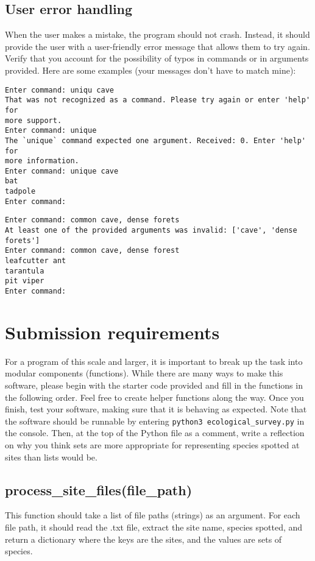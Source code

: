 \documentclass[12pt,letterpaper]{article}
\begin{document}
\subsection{User error handling}
When the user makes a mistake, the program should not crash. Instead, it should provide the user with a user-friendly error message that allows them to try again. Verify that you account for the possibility of typos in commands or in arguments provided. Here are some examples (your messages don't have to match mine):
\begin{lstlisting}
Enter command: uniqu cave
That was not recognized as a command. Please try again or enter 'help' for 
more support.
Enter command: unique
The `unique` command expected one argument. Received: 0. Enter 'help' for 
more information.
Enter command: unique cave
bat
tadpole
Enter command: 
\end{lstlisting}

\begin{lstlisting}
Enter command: common cave, dense forets 
At least one of the provided arguments was invalid: ['cave', 'dense forets']
Enter command: common cave, dense forest
leafcutter ant
tarantula
pit viper
Enter command: 
\end{lstlisting}

\section{Submission requirements}
For a program of this scale and larger, it is important to break up the task into modular components (functions). While there are many ways to make this software, please begin with the starter code provided and fill in the functions in the following order. Feel free to create helper functions along the way. Once you finish, test your software, making sure that it is behaving as expected. Note that the software should be runnable by entering \texttt{python3 ecological\_survey.py} in the console. Then, at the top of the Python file as a comment, write a reflection on why you think sets are more appropriate for representing species spotted at sites than lists would be.

\subsection{process\_site\_files(file\_path)}
This function should take a list of file paths (strings) as an argument. For each file path, it should read the .txt file, extract the site name, species spotted, and return a dictionary where the keys are the sites, and the values are sets of species.
\end{document}
